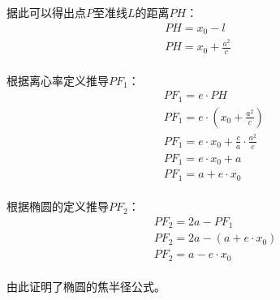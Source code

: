 \documentclass[UTF8]{ctexart}
\begin{document}
\newpage

    据此可以得出点$P$至准线$L$的距离$PH$：
    \begin{align}
        &PH=x_0-l\\[5mm]
        &PH=x_0+\frac{a^2}{c}~~~~~~~~~~~~~~
    \end{align}\\
    根据离心率定义推导$PF_1$：
    \begin{align}
        &PF_1=e\cdot PH\\[5mm]
        &PF_1=e\cdot\left(x_0+\frac{a^2}{c}\right)\\[5mm]
        &PF_1=e\cdot x_0+\frac{c}{a}\cdot\frac{a^2}{c}~~~~\\[5mm]
        &PF_1=e\cdot x_0+a\\[5mm]
        &PF_1=a+e\cdot x_0
    \end{align}\\
    根据椭圆的定义推导$PF_2$：
    \begin{align}
        &PF_2=2a-PF_1\\[5mm]
        &PF_2=2a-(a+e\cdot x_0)\\[5mm]
        &PF_2=a-e\cdot x_0
    \end{align}\\
    由此证明了椭圆的焦半径公式。

\newpage
\end{document}
